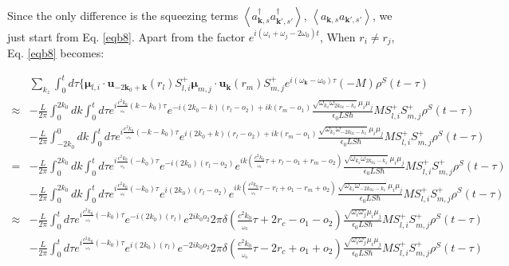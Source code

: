 \documentclass[aps,showpacs,twocolumn,twoside,groupedaddress]{revtex4}
\let\vec\bm
\begin{document}
\begin{widetext}
 Since the only difference is the squeezing terms $\left\langle a_{\vec{k},s}^{\dagger}a_{\vec{k}',s'}^{\dagger}\right\rangle$, $\left\langle a_{\vec{k},s}a_{\vec{k}',s'}\right\rangle $, we just start from Eq.  \eqref{eqb8}. Apart from the factor $e^{i(\omega_i+\omega_j-2\omega_0)t}$, When $r_i\ne r_j$, Eq. \eqref{eqb8} becomes:

\begin{equation}
\label{eqb1}\tag{B1}
\begin{split}
&\underset{k_{z}}{\sum}\int_{0}^{t}d\tau\{\vec{\mu}{}_{l,i}\cdot\vec{u}_{-2\vec{k}_{0}+\vec{k}}(r_{l})S_{l,i}^{+}\vec{\mu}_{m,j}\cdot\vec{u}_{\vec{k}}(r_{m})S_{m,j}^{+}e^{i(\omega_{\vec{k}}-\omega_{0})\tau}(-M)\rho^{S}(t-\tau)\\
\approx&-\frac{L}{2\pi}\int_{0}^{2k_{0}}dk\int_{0}^{t}d\tau e^{i\frac{c^{2}k_{0}}{_{\omega_{0}}}(k-k_{0})\tau}e^{-i(2k_{0}-k)(r_{l}-o_{2})+ik(r_{m}-o_{1})}\frac{\sqrt{\omega_{k_{z}}\omega_{2k_{0z}-k_{z}}}\mu_{i}\mu_{j}}{\epsilon_{0}LS\hbar}M S_{l,i}^{+}S_{m,j}^{+}\rho^{S}(t-\tau)\\
&-\frac{L}{2\pi}\int_{-2k_{0}}^{0}dk\int_{0}^{t}d\tau e^{i\frac{c^{2}k_{0}}{_{\omega_{0}}}(-k-k_{0})\tau}e^{i(2k_{0}+k)(r_{l}-o_{2})+ik(r_{m}-o_{1})}\frac{\sqrt{\omega_{k_{z}}\omega_{-2k_{0z}-k_{z}}}\mu_{i}\mu_{j}}{\epsilon_{0}LS\hbar}M S_{l,i}^{+}S_{m,j}^{+}\rho^{S}(t-\tau)\\
=&-\frac{L}{2\pi}\int_{0}^{2k_{0}}dk\int_{0}^{t}d\tau e^{i\frac{c^{2}k_{0}}{_{\omega_{0}}}(-k_{0})\tau}e^{-i(2k_{0})(r_{l}-o_{2})}e^{ik(\frac{c^{2}k_{0}}{_{\omega_{0}}}\tau+r_{l}-o_{1}+r_{m}-o_{2})}\frac{\sqrt{\omega_{k_{z}}\omega_{2k_{0z}-k_{z}}}\mu_{i}\mu_{j}}{\epsilon_{0}LS\hbar}M S_{l,i}^{+}S_{m,j}^{+}\rho^{S}(t-\tau)\\
&-\frac{L}{2\pi}\int_{0}^{2k_{0}}dk\int_{0}^{t}d\tau e^{i\frac{c^{2}k_{0}}{_{\omega_{0}}}(-k_{0})\tau}e^{i(2k_{0})(r_{l}-o_{2})}e^{ik(\frac{c^{2}k_{0}}{_{\omega_{0}}}\tau-r_{l}+o_{1}-r_{m}+o_{2})}\frac{\sqrt{\omega_{k_{z}}\omega_{-2k_{0z}-k_{z}}}\mu_{i}\mu_{j}}{\epsilon_{0}LS\hbar}M S_{l,i}^{+}S_{m,j}^{+}\rho^{S}(t-\tau)\\
\approx&-\frac{L}{2\pi}\int_{0}^{t}d\tau e^{i\frac{c^{2}k_{0}}{_{\omega_{0}}}(-k_{0})\tau}e^{-i(2k_{0})(r_{l})}e^{2ik_{0}o_{2}}2\pi\delta(\frac{c^{2}k_{0}}{_{\omega_{0}}}\tau+2r_{c}-o_{1}-o_{2})\frac{\sqrt{\omega_{i}\omega_{j}}\mu_{i}\mu_{j}}{\epsilon_{0}LS\hbar}M S_{l,i}^{+}S_{m,j}^{+}\rho^{S}(t-\tau)\\
&-\frac{L}{2\pi}\int_{0}^{t}d\tau e^{i\frac{c^{2}k_{0}}{_{\omega_{0}}}(-k_{0})\tau}e^{i(2k_{0})(r_{l})}e^{-2ik_{0}o_{2}}2\pi\delta(\frac{c^{2}k_{0}}{_{\omega_{0}}}\tau-2r_{c}+o_{1}+o_{2})\frac{\sqrt{\omega_{i}\omega_{j}}\mu_{i}\mu_{j}}{\epsilon_{0}LS\hbar}M S_{l,i}^{+}S_{m,j}^{+}\rho^{S}(t-\tau)\\

\end{split}
\end{equation}
\end{widetext}
\end{document}
